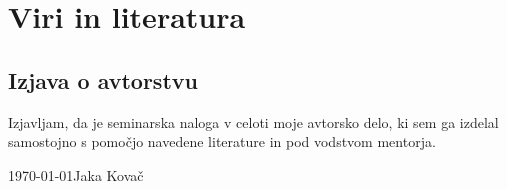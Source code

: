 \documentclass[12pt]{article}
\begin{document}
\newpage

\begingroup
\makeatletter
        \section{Viri in literatura}
        \nocite{*}
        \printbibliography[heading=none]
\makeatother
\endgroup
\newpage

\begin{samepage}
    \thispagestyle{empty}
    \section*{Izjava o avtorstvu}
    Izjavljam, da je seminarska naloga v celoti moje avtorsko delo, ki sem ga 
    izdelal samostojno s pomočjo navedene literature in pod vodstvom mentorja.

    \vfill
    
    \today \hfill Jaka Kovač
    
    \vspace{3 cm}
\end{samepage}
\end{document}
